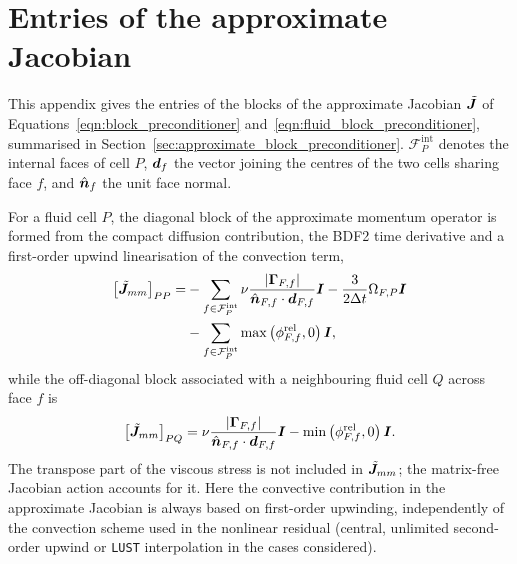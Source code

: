 \section{Entries of the approximate Jacobian}\label{app:jacobian}

This appendix gives the entries of the blocks of the approximate Jacobian $\tilde{\boldsymbol{J}}$ of Equations~\eqref{eqn:block_preconditioner} and~\eqref{eqn:fluid_block_preconditioner}, summarised in Section~\ref{sec:approximate_block_preconditioner}.
$\mathcal{F}^{\mathrm{int}}_P$ denotes the internal faces of cell $P$, $\boldsymbol{d}_f$ the vector joining the centres of the two cells sharing face $f$, and $\hat{\boldsymbol{n}}_f$ the unit face normal.

For a fluid cell $P$, the diagonal block of the approximate momentum operator
is formed from the compact diffusion contribution, the BDF2 time derivative and
a first-order upwind linearisation of the convection term,
\begin{align}
    \left[\tilde{\boldsymbol{J}}_{mm}\right]_{PP}
    =
    &-
    \sum_{f \in \mathcal{F}^{\mathrm{int}}_P}
    \nu
    \frac{|\boldsymbol{\Gamma}_{F,f}|}
         {\hat{\boldsymbol{n}}_{F,f} \cdot \boldsymbol{d}_{F,f}}
    \boldsymbol{I}
    -
    \frac{3}{2\Delta t}
    \Omega_{F,P}
    \boldsymbol{I}
    \notag \\
    &-
    \sum_{f \in \mathcal{F}^{\mathrm{int}}_P}
    \max\left(\phi^{\mathrm{rel}}_{F,f},0\right)\boldsymbol{I},
    \label{eqn:Jmm_diag}
\end{align}
while the off-diagonal block associated with a neighbouring fluid cell $Q$
across face $f$ is
\begin{equation}
    \left[\tilde{\boldsymbol{J}}_{mm}\right]_{PQ}
    =
    \nu
    \frac{|\boldsymbol{\Gamma}_{F,f}|}
         {\hat{\boldsymbol{n}}_{F,f} \cdot \boldsymbol{d}_{F,f}}
    \boldsymbol{I}
    -
    \min\left(\phi^{\mathrm{rel}}_{F,f},0\right)\boldsymbol{I}.
    \label{eqn:Jmm_offdiag}
\end{equation}
The transpose part of the viscous stress is not included in $\tilde{\boldsymbol{J}}_{mm}$; the matrix-free Jacobian action accounts for it.
Here the convective contribution in the approximate Jacobian is always based on first-order upwinding, independently of the convection scheme used in the nonlinear residual (central, unlimited second-order upwind or \texttt{LUST} interpolation in the cases considered).

